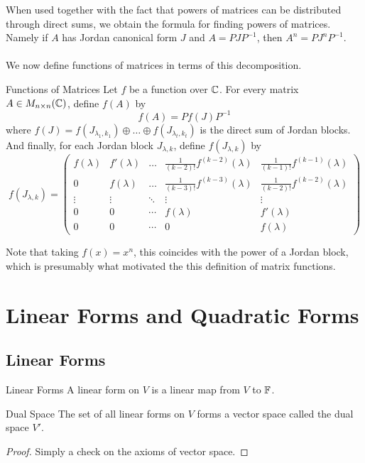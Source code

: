 \documentclass[a4paper]{article}
\begin{document}
When used together with the fact that powers of matrices can be distributed through direct sums, we obtain the formula for finding powers of matrices. Namely if $A$ has Jordan canonical form $J$ and $A=PJP^{-1}$, then $A^n=PJ^nP^{-1}$. \\~\\

We now define functions of matrices in terms of this decomposition. 

\begin{defn}{Functions of Matrices}{} Let $f$ be a function over $\mathbb{C}$. For every matrix $A\in M_{n\times n}(\mathbb{C})$, define $f(A)$ by $$f(A)=Pf(J)P^{-1}$$ where $f(J)=f(J_{\lambda_1,k_1})\oplus\dots\oplus f(J_{\lambda_t,k_t})$ is the direct sum of Jordan blocks. And finally, for each Jordan block $J_{\lambda,k}$, define $f(J_{\lambda,k})$ by $$f(J_{\lambda,k})=\begin{pmatrix}
f(\lambda) & f'(\lambda) & \dots & \frac{1}{(k-2)!}f^{(k-2)}(\lambda) & \frac{1}{(k-1)!}f^{(k-1)}(\lambda)\\
0 & f(\lambda) & \dots & \frac{1}{(k-3)!}f^{(k-3)}(\lambda) & \frac{1}{(k-2)!}f^{(k-2)}(\lambda)\\
\vdots & \vdots & \ddots & \vdots & \vdots\\
0 & 0 & \cdots & f(\lambda) & f'(\lambda)\\
0 & 0 & \cdots & 0 & f(\lambda)
\end{pmatrix}$$
\end{defn}

Note that taking $f(x)=x^n$, this coincides with the power of a Jordan block, which is presumably what motivated the this definition of matrix functions. 

\pagebreak
\section{Linear Forms and Quadratic Forms}
\subsection{Linear Forms}
\begin{defn}{Linear Forms}{} A linear form on $V$ is a linear map from $V$ to $\mathbb{F}$. 
\end{defn}

\begin{prp}{Dual Space}{} The set of all linear forms on $V$ forms a vector space called the dual space $V'$. \tcbline
\begin{proof}
Simply a check on the axioms of vector space. 
\end{proof}
\end{prp}
\end{document}
